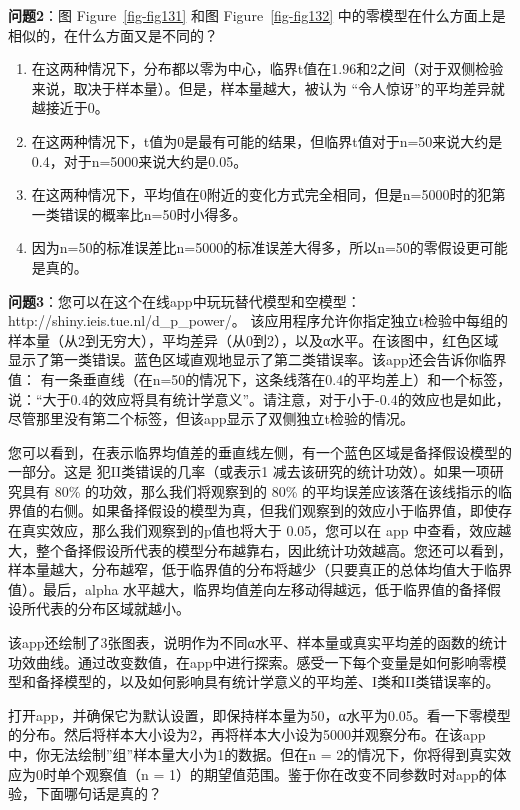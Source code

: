 \documentclass[
  letterpaper,
  DIV=11,
  numbers=noendperiod]{scrreprt}
\providecommand{\tightlist}{%
  \setlength{\itemsep}{0pt}\setlength{\parskip}{0pt}}\usepackage{longtable,booktabs,array}
\begin{document}
\textbf{问题2}：图 Figure~\ref{fig-fig131} 和图 Figure~\ref{fig-fig132}
中的零模型在什么方面上是相似的，在什么方面又是不同的？

\begin{enumerate}
\def\labelenumi{\Alph{enumi})}
\tightlist
\item
  在这两种情况下，分布都以零为中心，临界t值在1.96和2之间（对于双侧检验来说，取决于样本量）。但是，样本量越大，被认为
  ``令人惊讶''的平均差异就越接近于0。
\item
  在这两种情况下，t值为0是最有可能的结果，但临界t值对于n=50来说大约是0.4，对于n=5000来说大约是0.05。
\item
  在这两种情况下，平均值在0附近的变化方式完全相同，但是n=5000时的犯第一类错误的概率比n=50时小得多。
\item
  因为n=50的标准误差比n=5000的标准误差大得多，所以n=50的零假设更可能是真的。
\end{enumerate}

\textbf{问题3}：您可以在这个在线app中玩玩替代模型和空模型：http://shiny.ieis.tue.nl/d\_p\_power/。
该应用程序允许你指定独立t检验中每组的样本量（从2到无穷大），平均差异（从0到2），以及α水平。在该图中，红色区域显示了第一类错误。蓝色区域直观地显示了第二类错误率。该app还会告诉你临界值：
有一条垂直线（在n=50的情况下，这条线落在0.4的平均差上）和一个标签，说：``大于0.4的效应将具有统计学意义''。请注意，对于小于-0.4的效应也是如此，尽管那里没有第二个标签，但该app显示了双侧独立t检验的情况。

您可以看到，在表示临界均值差的垂直线左侧，有一个蓝色区域是备择假设模型的一部分。这是
犯II类错误的几率（或表示1 减去该研究的统计功效）。如果一项研究具有 80\%
的功效，那么我们将观察到的 80\%
的平均误差应该落在该线指示的临界值的右侧。如果备择假设的模型为真，但我们观察到的效应小于临界值，即使存在真实效应，那么我们观察到的p值也将大于
0.05，您可以在 app
中查看，效应越大，整个备择假设所代表的模型分布越靠右，因此统计功效越高。您还可以看到，样本量越大，分布越窄，低于临界值的分布将越少（只要真正的总体均值大于临界值）。最后，alpha
水平越大，临界均值差向左移动得越远，低于临界值的备择假设所代表的分布区域就越小。

该app还绘制了3张图表，说明作为不同α水平、样本量或真实平均差的函数的统计功效曲线。通过改变数值，在app中进行探索。感受一下每个变量是如何影响零模型和备择模型的，以及如何影响具有统计学意义的平均差、I类和II类错误率的。

打开app，并确保它为默认设置，即保持样本量为50，α水平为0.05。看一下零模型的分布。然后将样本大小设为2，再将样本大小设为5000并观察分布。在该app中，你无法绘制''组''样本量大小为1的数据。但在n
= 2的情况下，你将得到真实效应为0时单个观察值（n =
1）的期望值范围。鉴于你在改变不同参数时对app的体验，下面哪句话是真的？
\end{document}
